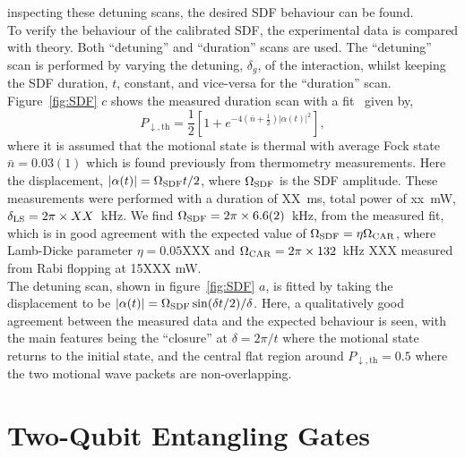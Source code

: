     inspecting these detuning scans, the desired SDF behaviour can be found. \\
    To verify the behaviour of the calibrated SDF, the experimental data is compared with theory. Both
    ``detuning'' and ``duration'' scans are used. The ``detuning'' scan is performed by
    varying the detuning, $\delta_g$, of the interaction, whilst keeping the
    SDF duration, $t$, constant, and vice-versa for the ``duration'' scan. \\
    Figure~\ref{fig:SDF} $c$ shows the measured duration scan with a fit~\cite{} given by,
    \begin{equation}
        P_{\downarrow,\mathrm{th}} = \frac{1}{2} \left[ 1 + e^{-4\left( \bar{n} + \frac{1}{2} \right) |\alpha(t)|^2} \right],
    \end{equation}
    where it is assumed that the motional state is thermal with average Fock state $\bar{n}
    = 0.03(1)$ which is found previously from thermometry measurements. Here the
    displacement, $|\alpha(t)| = \Omega_{\rm SDF} t/2$, where $\Omega_{\rm SDF}$ is the
    SDF amplitude. 
    These measurements were performed with a duration of XX~ms, total power of xx~mW, $\delta_{\rm LS}=2\pi\times XX$~kHz.
    We find $\Omega_{\rm SDF} = 2\pi\times 6.6(2)$~kHz, from the
    measured fit, which is in good agreement with the expected value of
    $\Omega_{\rm SDF} = \eta\Omega_{\rm CAR}$, where Lamb-Dicke parameter $\eta =
    0.05$XXX and $\Omega_{\rm CAR} = 2\pi \times 132$~kHz XXX measured from Rabi
    flopping at 15XXX mW.\\
    The detuning scan, shown in figure~\ref{fig:SDF} $a$, is fitted by taking the
    displacement to be $|\alpha(t)| = \Omega_{\rm SDF} \sin(\delta t/2)/\delta$. Here,
    a qualitatively good agreement between the measured data and the
    expected behaviour is seen, with the main features being the ``closure''
    at $\delta = 2\pi/t$ where the motional state returns to the initial state,
    and the central flat region around $P_{\downarrow, \mathrm{th}} =0.5$ where
    the two motional wave packets are non-overlapping.\\


\section{Two-Qubit Entangling Gates}
\label{sec:Two-Qubit Entangling Gates}

